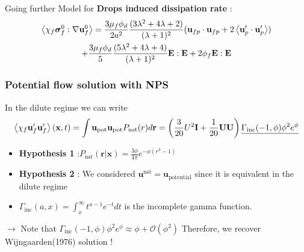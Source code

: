 \documentclass{sintefbeamer}
\begin{document}
\backmatter
\begin{frame}
  

  

\end{frame}
\begin{frame}
  {Going further}
   Model for \textbf{Drops induced dissipation rate} : 
   \begin{multline*}
    \left<\chi_f \bm\sigma_f^0 :\mathbf{\nabla}\textbf{u}_f^0\right>
    =
    \frac{3\mu_f \phi_d}{2a^2}
    \frac{(3\lambda^2 + 4\lambda +2)}{(\lambda + 1)^2}
    (\textbf{u}_{fp}\cdot \textbf{u}_{fp} + 2 \left<\textbf{u}_p'\cdot\textbf{u}_p'\right>) \\
    + 
    \frac{3\mu_f \phi_d}{5}
    \frac{(5\lambda^2 + 4\lambda +4)}{(\lambda + 1)^2}
    \textbf{E}:\textbf{E}
    +2 \phi_f \textbf{E}:\textbf{E}
\end{multline*}
\end{frame}

\begin{frame}
  \frametitle{Potential flow solution with NPS}
  In the dilute regime we can write 
  \begin{multline*}
    \left<\chi_f \textbf{u}'_f\textbf{u}'_f\right>(\textbf{x},t)
    = 
    {\int \textbf{u}_\text{pot} \textbf{u}_\text{pot}  
    P_\text{nst}(r) d\textbf{r} }
    =  \left(\frac{3}{20} U^2\textbf{I} + \frac{1}{20}\textbf{UU} \right)
    \underline{\Gamma_\text{inc}(-1,\phi)\phi^2 e^\phi}
  \end{multline*}

  \begin{itemize}
    \item  \textbf{Hypothesis 1} :$P_\text{nst}(\textbf{r}|\textbf{x}) = \frac{3\phi}{4\pi}
    e^{ - \phi (r^3 - 1) }$
    \item \textbf{Hypothesis 2} : We considered $\textbf{u}^\text{nst} = \textbf{u}_\text{potential}$ since it is equivalent in the dilute regime
    \item $\Gamma_\text{inc}(a,x) = \int_x^\infty t^{a-1} e^{-t} dt $ is the incomplete gamma  function. 
  \end{itemize}

  $\to$ Note that $\Gamma_\text{inc}(-1,\phi)\phi^2 e^\phi \approx  \phi + \mathcal{O}(\phi^2)$ Therefore, we recover  Wijngaarden(1976) solution ! 

\end{frame}
\end{document}
